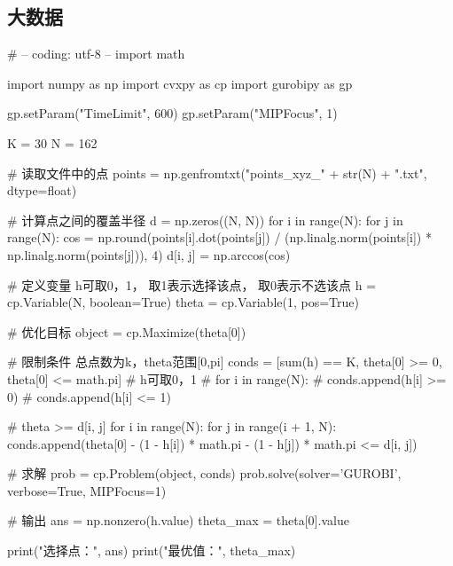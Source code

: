 \subsection{大数据}
\begin{python}
    # -- coding: utf-8 --
import math

import numpy as np
import cvxpy as cp
import gurobipy as gp

gp.setParam("TimeLimit", 600)
gp.setParam("MIPFocus", 1)


K = 30
N = 162

# 读取文件中的点
points = np.genfromtxt("points_xyz_" + str(N) + ".txt", dtype=float)

# 计算点之间的覆盖半径
d = np.zeros((N, N))
for i in range(N):
    for j in range(N):
        cos = np.round(points[i].dot(points[j]) / (np.linalg.norm(points[i]) * np.linalg.norm(points[j])), 4)
        d[i, j] = np.arccos(cos)

# 定义变量 h可取0，1， 取1表示选择该点， 取0表示不选该点
h = cp.Variable(N, boolean=True)
theta = cp.Variable(1, pos=True)

# 优化目标
object = cp.Maximize(theta[0])

# 限制条件 总点数为k，theta范围[0,pi]
conds = [sum(h) == K,
         theta[0] >= 0,
         theta[0] <= math.pi]
# h可取0，1
# for i in range(N):
#     conds.append(h[i] >= 0)
#     conds.append(h[i] <= 1)

# theta >= d[i, j]
for i in range(N):
    for j in range(i + 1, N):
        conds.append(theta[0] - (1 - h[i]) * math.pi - (1 - h[j]) * math.pi <= d[i, j])

# 求解
prob = cp.Problem(object, conds)
prob.solve(solver='GUROBI', verbose=True, MIPFocus=1)

# 输出
ans = np.nonzero(h.value)
theta_max = theta[0].value

print("选择点：", ans)
print("最优值：", theta_max)

\end{python}

